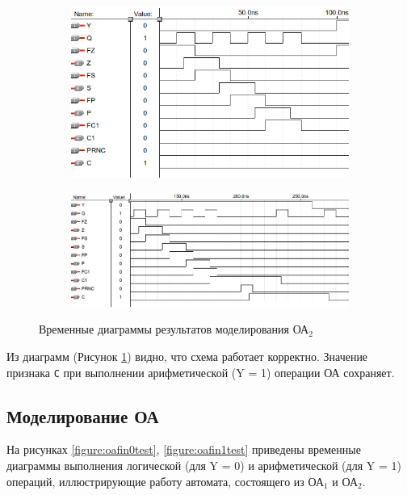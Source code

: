 \begin{figure}[H]
	\begin{subfigure}[b]{0.6\textwidth}
		\includegraphics[scale=0.6]{images/altera/rev2/OA2_PRNC/test2_WITH_CONTROL_SIGNAL_Y=0.png}
		\caption{}
	\end{subfigure}

	\begin{subfigure}[b]{1\textwidth}
		\includegraphics[scale=0.6]{images/altera/rev2/OA2_PRNC/test2_WITH_CONTROL_SIGNAL_Y=1.png}
		\caption{}
	\end{subfigure}
	\caption{Временные диаграммы результатов моделирования ОА$_2$}
	\label{figure:oa2test}
\end{figure}

Из диаграмм (Рисунок \ref{figure:oa2test}) видно, что схема работает корректно. Значение признака \texttt{C} при выполнении арифметической (Y = 1) операции ОА сохраняет.

\clearpage
\subsection{Моделирование ОА}

На рисунках \ref{figure:oafin0test}, \ref{figure:oafin1test} приведены временные диаграммы выполнения логической (для Y = 0) и арифметической (для Y = 1) операций, иллюстрирующие работу автомата, состоящего из ОА$_1$ и ОА$_2$.

